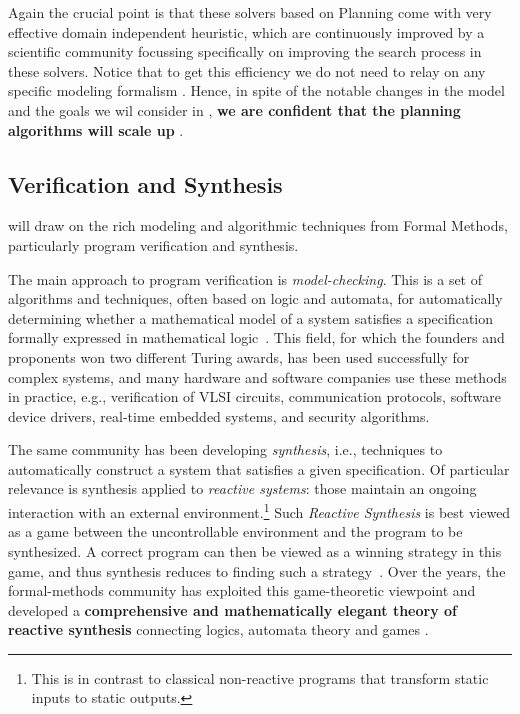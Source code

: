 Again the crucial point is that these solvers based on Planning come with very effective domain independent heuristic, which are continuously improved by a scientific community focussing specifically on improving the search process in these solvers. Notice that to get this efficiency we do not need to relay on any specific modeling formalism \cite{FRLG17}.  Hence, in spite of the notable changes in the model and the goals we wil consider in \project, \textbf{we are confident that the planning algorithms will scale up} .





\subsection{Verification and Synthesis}

\project will draw on the rich modeling and algorithmic techniques
from Formal Methods, particularly program verification and synthesis.

The main approach to program verification is \emph{model-checking}.
This is a set of algorithms and techniques, often based on logic and
automata, for automatically determining whether a mathematical model
of a system satisfies a specification formally expressed in
mathematical logic~\cite{ClarkeGP:99-ModelChecking,BaKG08}.  This
field, for which the founders and proponents won two different Turing
awards, has been used successfully for complex systems, and many
hardware and software companies use these methods in practice, e.g.,
verification of VLSI circuits, communication protocols, software
device drivers, real-time embedded systems, and security algorithms. 

The same community has been developing \emph{synthesis}, i.e.,
techniques to automatically construct a system that satisfies a given
specification. Of particular relevance is synthesis applied to
\emph{reactive systems}: those maintain an ongoing interaction with an
external environment.\footnote{This is in contrast to classical
non-reactive programs that transform static inputs to static outputs.}
Such \emph{Reactive Synthesis} is best viewed as a game between the
uncontrollable environment and the program to be synthesized. A
correct program can then be viewed as a winning strategy in this game,
and thus synthesis reduces to finding such a
strategy~\cite{Chu63,PnRo89}. Over the years, the formal-methods
community has exploited this game-theoretic viewpoint and developed a
\textbf{comprehensive and mathematically elegant theory of reactive
synthesis} connecting logics, automata theory and games
\cite{Vard95,KuVa97,KupfermanV05,KupfermanPV06,Vardi08,RyanTacas05,ChatterjeeH07,BloemJPPS12,BohyBFJR12,FinkbeinerS13,LustigV13,FogartyKVW15,DGenestPS15,FearnleyPS15,BloemCJK15,AlurMT16,EsparzaKRS17,BrenguierRS17,HunterPR17}.

